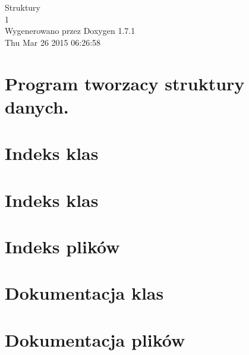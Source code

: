 \documentclass[a4paper]{book}
\begin{document}
\hypersetup{pageanchor=false}
\begin{titlepage}
\vspace*{7cm}
\begin{center}
{\Large Struktury \\[1ex]\large 1 }\\
\vspace*{1cm}
{\large Wygenerowano przez Doxygen 1.7.1}\\
\vspace*{0.5cm}
{\small Thu Mar 26 2015 06:26:58}\\
\end{center}
\end{titlepage}
\clearemptydoublepage
{}
\tableofcontents
\clearemptydoublepage
{}
\hypersetup{pageanchor=true}
\chapter{Program tworzacy struktury danych.}
\label{index}\hypertarget{index}{}
\chapter{Indeks klas}

\chapter{Indeks klas}

\chapter{Indeks plików}

\chapter{Dokumentacja klas}





\chapter{Dokumentacja plików}









\printindex
\end{document}
